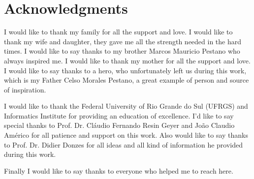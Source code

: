 \chapter*{Acknowledgments}
I would like to thank my family for all the support and love. I would like to thank my wife and daughter, they gave me all the strength needed in the hard times. I would like to say thanks to my brother Marcos Mauricio Pestano who always inspired me. I would like to thank my mother for all the support and love. I would like to say thanks to a hero, who unfortunately left us during this work, which is my Father Celso Morales Pestano, a great example of person and source of inspiration.

I would like to thank the Federal University of Rio Grande do Sul (UFRGS) and Informatics Institute for providing an education of excellence. I'd like to say special thanks to Prof. Dr. Cláudio Fernando Resin Geyer and João Claudio Américo for all patience and support on this work. Also would like to say thanks to Prof. Dr. Didier Donzes for all ideas and all kind of information he provided during this work.

Finally I would like to say thanks to everyone who helped me to reach here.
   
